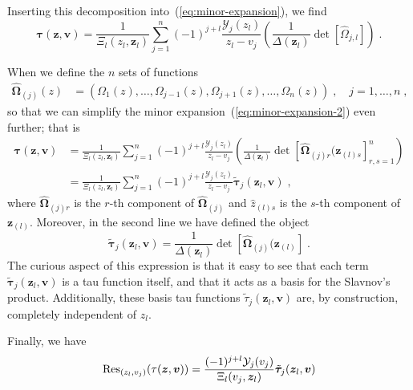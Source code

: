 \documentclass[a4paper,12pt]{amsart}
\begin{document}
Inserting this decomposition into~(\ref{eq:minor-expansion}), we find
\begin{equation}
\label{eq:minor-expansion-2}
  \bm{\tau}(\bm{z}, \bm{v})
   = \frac{1}{\Xi_l(z_l, \bm{z}_l)} \sum_{j=1}^n (-1)^{j + l} \frac{\mathcal{Y}_j(z_l)}{z_l - v_j} 
\left(\frac{1}{\Delta(\bm{z}_l)} \det[\hat{\Omega}_{j, l}]\right)\; .
\end{equation}

When we define the \(n\) sets of functions
\begin{equation}
  \begin{split}
    \hat{\bm{\Omega}}_{(j)}(z) & = \left(\Omega_1(z), \dots, \Omega_{j-1}(z), \Omega_{j+1}(z), \dots, \Omega_n(z) \right)\; ,
    \quad j =1, \dots, n\; ,
  \end{split}
\end{equation}
so that we can simplify the minor
expansion~(\ref{eq:minor-expansion-2}) even further; that is
\begin{equation}
\begin{split}
  \bm{\tau}(\bm{z}, \bm{v})
  & = \frac{1}{\Xi_l(z_l, \bm{z}_l)} \sum_{j=1}^n (-1)^{j + l} \frac{\mathcal{Y}_j(z_l)}{z_l - v_j} 
    \left(\frac{1}{\Delta(\bm{z}_l)} \det[\hat{\bm{\Omega}}_{(j) r}(\bm{z}_{(l) s} ]_{r, s=1}^n\right)\\ 
  & = \frac{1}{\Xi_l(z_l, \bm{z}_l)} \sum_{j=1}^n (-1)^{j + l} \frac{\mathcal{Y}_j(z_l)}{z_l - v_j} 
    \tilde{\bm{\tau}}_j(\bm{z}_l, \bm{v})\; ,
\end{split}
\end{equation}
where \(\hat{\bm{\Omega}}_{(j)r}\) is the \(r\)-th component of
\(\hat{\bm{\Omega}}_{(j)}\) and \(\hat{z}_{(l)s}\) is the \(s\)-th
component of \(\bm{z}_{(l)}\). Moreover, in the second line we have
defined the object
\begin{equation}
  \label{eq:basis-tau}
    \tilde{\bm{\tau}}_j(\bm{z}_l, \bm{v}) = 
\frac{1}{\Delta(\bm{z}_l)} \det[\hat{\bm{\Omega}}_{(j)}(\bm{z}_{(l)} ]\; .
\end{equation}
The curious aspect of this expression is that it easy to see that each term  
\(\tilde{\bm{\tau}}_j(\bm{z}_l, \bm{v})\) is a tau function itself, and that
it acts as a basis for the Slavnov's product. 
Additionally, these basis tau functions \(\tilde{\tau}_j(\bm{z}_l,
\bm{v})\) are, by construction, completely independent of \(z_l\).

Finally, we have
\begin{equation}
  \operatorname{Res}_{(z_l, v_j)}(\tau(\bm{z}, \bm{v}))
  = \frac{(-1)^{j + l} \mathcal{Y}_j(v_j)}{\Xi_l(v_j, \bm{z}_l)}
  \tilde{\bm{\tau}}_j(\bm{z}_l, \bm{v})
\end{equation}
\end{document}
